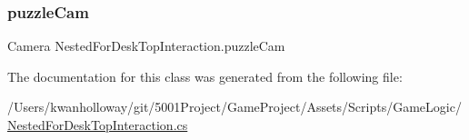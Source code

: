 \mbox{\label{class_nested_for_desk_top_interaction_ab23a4eaa0c552fe591657fb7176b0dfb}} 
\subsubsection{\texorpdfstring{puzzle\+Cam}{puzzleCam}}
{\footnotesize\ttfamily Camera Nested\+For\+Desk\+Top\+Interaction.\+puzzle\+Cam}



The documentation for this class was generated from the following file\+:\begin{DoxyCompactItemize}
\item 
/\+Users/kwanholloway/git/5001\+Project/\+Game\+Project/\+Assets/\+Scripts/\+Game\+Logic/\hyperlink{_nested_for_desk_top_interaction_8cs}{Nested\+For\+Desk\+Top\+Interaction.\+cs}\end{DoxyCompactItemize}
